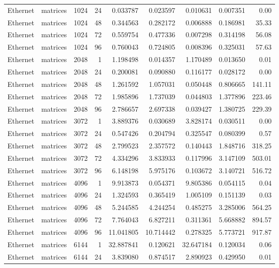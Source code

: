\begin{longtable}{llrrrrrrr}
Ethernet & matrices & 1024 & 24 & 0.033787 & 0.023597 & 0.010631 & 0.007351 & 0.00 \\
Ethernet & matrices & 1024 & 48 & 0.344563 & 0.282172 & 0.006888 & 0.186981 & 35.33 \\
Ethernet & matrices & 1024 & 72 & 0.559754 & 0.477336 & 0.007298 & 0.314198 & 56.08 \\
Ethernet & matrices & 1024 & 96 & 0.760043 & 0.724805 & 0.008396 & 0.325031 & 57.63 \\
Ethernet & matrices & 2048 & 1 & 1.198498 & 0.014357 & 1.170489 & 0.013650 & 0.01 \\
Ethernet & matrices & 2048 & 24 & 0.200081 & 0.090880 & 0.116177 & 0.028172 & 0.00 \\
Ethernet & matrices & 2048 & 48 & 1.261592 & 1.057031 & 0.050448 & 0.806665 & 141.11 \\
Ethernet & matrices & 2048 & 72 & 1.985896 & 1.737039 & 0.044803 & 1.377896 & 223.46 \\
Ethernet & matrices & 2048 & 96 & 2.786657 & 2.697338 & 0.039427 & 1.380725 & 229.39 \\
Ethernet & matrices & 3072 & 1 & 3.889376 & 0.030689 & 3.828174 & 0.030511 & 0.00 \\
Ethernet & matrices & 3072 & 24 & 0.547426 & 0.204794 & 0.325547 & 0.080399 & 0.57 \\
Ethernet & matrices & 3072 & 48 & 2.799523 & 2.357572 & 0.140443 & 1.848716 & 318.25 \\
Ethernet & matrices & 3072 & 72 & 4.334296 & 3.833933 & 0.117996 & 3.147109 & 503.01 \\
Ethernet & matrices & 3072 & 96 & 6.148198 & 5.975176 & 0.103672 & 3.140721 & 516.72 \\
Ethernet & matrices & 4096 & 1 & 9.913873 & 0.054371 & 9.805386 & 0.054115 & 0.04 \\
Ethernet & matrices & 4096 & 24 & 1.324593 & 0.365419 & 1.005109 & 0.151139 & 0.03 \\
Ethernet & matrices & 4096 & 48 & 5.244585 & 4.244254 & 0.485275 & 3.285006 & 564.25 \\
Ethernet & matrices & 4096 & 72 & 7.764043 & 6.827211 & 0.311361 & 5.668882 & 894.57 \\
Ethernet & matrices & 4096 & 96 & 11.041805 & 10.714442 & 0.278325 & 5.773721 & 917.87 \\
Ethernet & matrices & 6144 & 1 & 32.887841 & 0.120621 & 32.647184 & 0.120034 & 0.06 \\
Ethernet & matrices & 6144 & 24 & 3.839080 & 0.874517 & 2.890923 & 0.429950 & 0.01 \\

\end{longtable}
